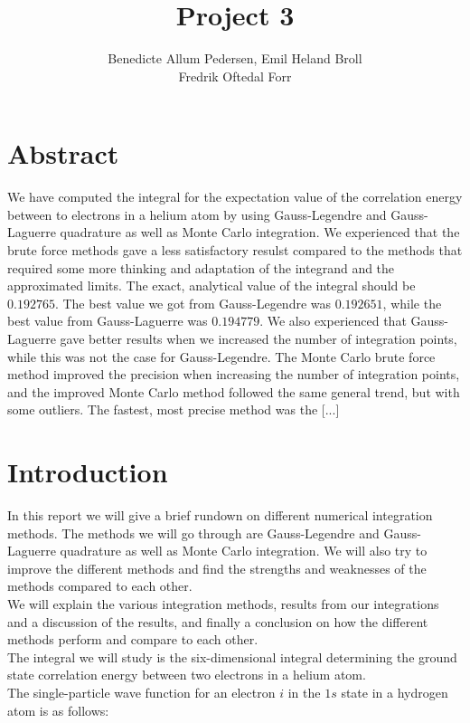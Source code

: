 \documentclass{article}
\title{Project 3}\vspace{-3ex}
\author{Benedicte Allum Pedersen, Emil Heland Broll\\ Fredrik Oftedal Forr}
\date{\vspace{-5ex}}
\begin{document}
\maketitle

\section*{Abstract}
	We have computed the integral for the expectation value of the correlation energy between to electrons in a helium atom by using Gauss-Legendre and Gauss-Laguerre quadrature as well as Monte Carlo integration. We experienced that the brute force methods gave a less satisfactory resulst compared to the methods that required some more thinking and adaptation of the integrand and the approximated limits. The exact, analytical value of the integral should be $0.192765$. The best value we got from Gauss-Legendre was $0.192651$, while the best value from Gauss-Laguerre was $0.194779$. We also experienced that Gauss-Laguerre gave better results when we increased the number of integration points, while this was not the case for Gauss-Legendre.
	The Monte Carlo brute force method improved the precision when increasing the number of integration points, and the improved Monte Carlo method followed the same general trend, but with some outliers.
	The fastest, most precise method was the [...]

\section*{Introduction}
	In this report we will give a brief rundown on different numerical integration methods. The methods we will go through are Gauss-Legendre and Gauss-Laguerre quadrature as well as Monte Carlo integration. We will also try to improve the different methods and find the strengths and weaknesses of the methods compared to each other.\\
	We will explain the various integration methods, results from our integrations and a discussion of the results, and finally a conclusion on how the different methods perform and compare to each other.\\

	The integral we will study is the six-dimensional integral determining the ground state correlation energy between two electrons in a helium atom.\\

	The single-particle wave function for an electron $i$ in the $1s$ state in a hydrogen atom is as follows:
\end{document}
